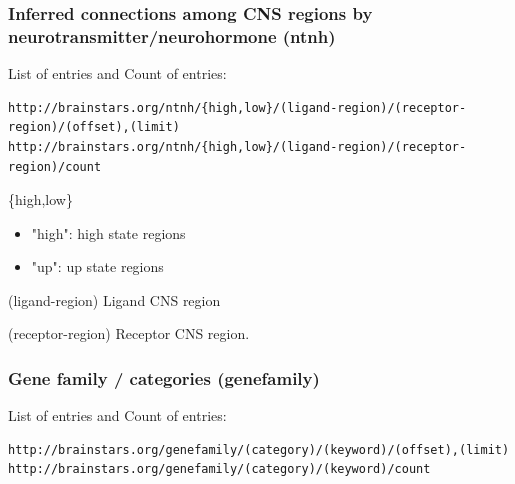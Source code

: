\documentclass[12pt,fullpage]{article}
\begin{document}
\subsubsection{Inferred connections among CNS regions by neurotransmitter/neurohormone (ntnh)}
List of entries and Count of entries: 
\begin{verbatim}
http://brainstars.org/ntnh/{high,low}/(ligand-region)/(receptor-region)/(offset),(limit) 
http://brainstars.org/ntnh/{high,low}/(ligand-region)/(receptor-region)/count 
\end{verbatim}

\begin{description}
  \item{\{high,low\}}
    \begin{itemize}
      \item "high": high state regions
      \item "up": up state regions
    \end{itemize}        
  \item{(ligand-region)} Ligand CNS region
  \item{(receptor-region)} Receptor CNS region.
\end{description}

\subsubsection{Gene family / categories (genefamily)}
List of entries and Count of entries: 
\begin{verbatim}
http://brainstars.org/genefamily/(category)/(keyword)/(offset),(limit) 
http://brainstars.org/genefamily/(category)/(keyword)/count 
\end{verbatim}
\end{document}

